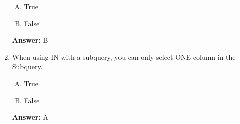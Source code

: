 \documentclass[12pt]{article}
\begin{document}
\begin{enumerate}[1.]
    \begin{enumerate}[A.]
        \item True
        \item False
    \end{enumerate}

    \bigskip

    \textbf{Answer:} B


    \item

    When using IN with a subquery, you can only select ONE column in the Subquery.

    \begin{enumerate}[A.]
        \item True
        \item False
    \end{enumerate}

    \bigskip

    \textbf{Answer:} A

\end{enumerate}
\end{document}
